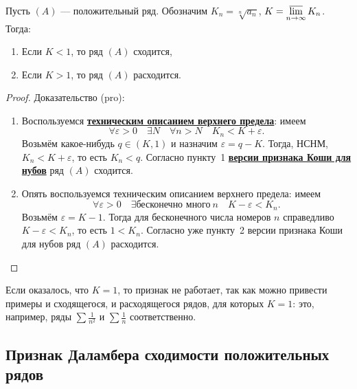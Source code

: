 \begin{theorem}
	Пусть \((A)\) --- положительный ряд. Обозначим \(K_n = \sqrt[n]{a_n}\), \(K = \varlimsup\limits_{n \to \infty} K_n\). Тогда:
	\begin{enumerate}
		\item Если \(K < 1\), то ряд \((A)\) сходится,
		\item Если \(K > 1\), то ряд \((A)\) расходится.
	\end{enumerate}
\end{theorem}
\begin{proof}
	Доказательство (pro):
	\begin{enumerate}
		\item Воспользуемся \hyperlink{техническое описание верхнего предела}{\bfseries техническим описанием верхнего предела}: имеем \[
		\forall \varepsilon > 0 \quad \exists N \quad \forall n > N \quad K_n < K + \varepsilon.
		\]
		Возьмём какое-нибудь \(q \in (K, 1)\) и назначим \(\varepsilon = q - K\). Тогда, НСНМ, \(K_n < K + \varepsilon\), то есть \(K_n < q\). Согласно пункту~1 \hyperlink{Коши-нуб}{\bfseries версии признака Коши для нубов} ряд \((A)\) сходится.
		\item Опять воспользуемся техническим описанием верхнего предела: имеем \[
		\forall \varepsilon > 0 \quad \exists \textit{бесконечно много} \ n \quad K - \varepsilon < K_n.
		\]
		Возьмём \(\varepsilon = K - 1\). Тогда для бесконечного числа номеров \(n\) справедливо \(K - \varepsilon < K_n\), то есть \(1 < K_n\). Согласно уже пункту~2 версии признака Коши для нубов ряд \((A)\) расходится.
	\end{enumerate}
\end{proof}

\begin{remark}
	Если оказалось, что \(K = 1\), то признак не работает, так как можно привести примеры и сходящегося, и расходящегося рядов, для которых \(K = 1\): это, например, ряды \(\sum \frac{1}{n^2}\) и \(\sum \frac{1}{n}\) соответственно.
\end{remark}

\subsection{Признак Даламбера сходимости положительных рядов}

